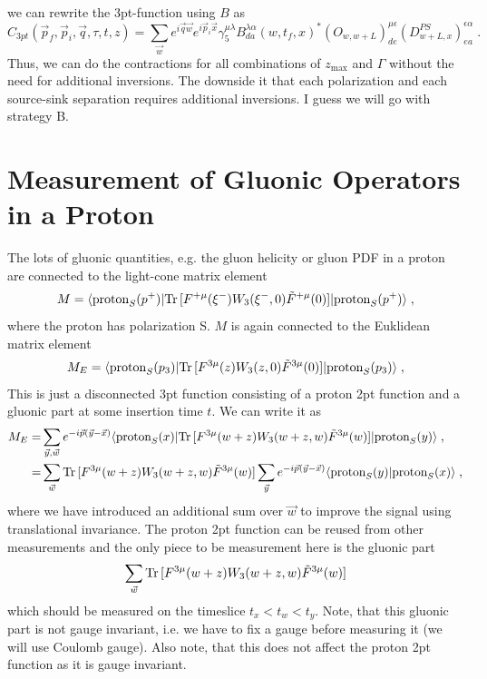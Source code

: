 \documentclass[a4paper,10pt]{scrartcl}
\newcommand{\tr}{\text{Tr\,}}
\begin{document}
we can rewrite the 3pt-function using $B$ as
\begin{equation}
    C_{3pt}(\vec p_f, \vec p_i, \vec q, \tau, t, z) = \sum_{\vec w} e^{i \vec q \vec w} e^{i \vec p_i \vec x} \gamma_5^{\mu \lambda}
    B^{\lambda \alpha}_{da}(w,t_f,x)^* (O_{w,w+L})^{\mu \epsilon}_{de} (D^{PS}_{w+L,x})^{\epsilon \alpha}_{ea} \; .
\end{equation}
Thus, we can do the contractions for all combinations of $z_\text{max}$ and $\Gamma$ without the need for additional inversions. The downside
it that each polarization and each source-sink separation requires additional inversions. \newline
I guess we will go with strategy B.

\section{Measurement of Gluonic Operators in a Proton}
The lots of gluonic quantities, e.g. the gluon helicity or gluon PDF in a proton are connected to the light-cone matrix element
\begin{eqnarray}
    M = \langle \text{proton}_S(p^+) | \tr [F^{+\mu}(\xi^-) W_3(\xi^-,0) \tilde F^{+\mu}(0)] | \text{proton}_S(p^+) \rangle \; ,
\end{eqnarray}
where the proton has polarization S. $M$ is again connected to the Euklidean matrix element
\begin{eqnarray}
    M_E = \langle \text{proton}_S(p_3) | \tr [F^{3\mu}(z) W_3(z,0) \tilde F^{3\mu}(0)] | \text{proton}_S(p_3) \rangle \; ,
\end{eqnarray}
This is just a disconnected 3pt function consisting of a proton 2pt function and a gluonic part at some insertion time $t$.
We can write it as
\begin{align}
    M_E =& \sum_{\vec y, \vec w} e^{-i \vec p (\vec y - \vec x)} \langle \text{proton}_S(x) | \tr [F^{3\mu}(w+z) W_3(w+z,w) \tilde F^{3\mu}(w)]
    | \text{proton}_S(y)  \rangle \; , \\
    =& \sum_{\vec w} \tr [F^{3\mu}(w+z) W_3(w+z,w) \tilde F^{3\mu}(w)] \sum_{\vec y} e^{-i \vec p (\vec y - \vec x)} \langle \text{proton}_S(y) | \text{proton}_S(x)  \rangle \; ,
\end{align}
where we have introduced an additional sum over $\vec w$ to improve the signal using translational invariance. The proton 2pt
function can be reused from other measurements and the only piece to be measurement here is the gluonic part
\begin{equation}
    \sum_{\vec w} \tr [F^{3\mu}(w+z) W_3(w+z,w) \tilde F^{3\mu}(w)]
\end{equation}
which should be measured on the timeslice $t_x < t_w < t_y$. Note, that this gluonic part is not gauge invariant, i.e.
we have to fix a gauge before measuring it (we will use Coulomb gauge). Also note, that this does not affect the proton 2pt
function as it is gauge invariant.  
\end{document}

